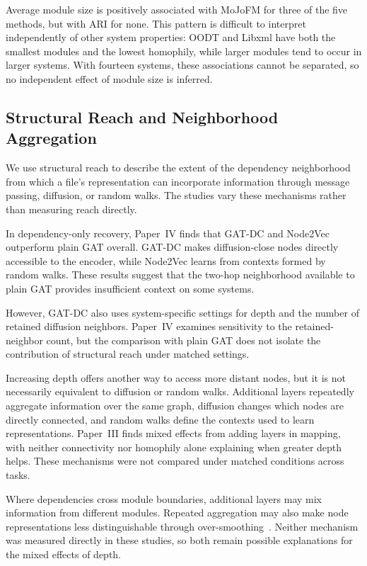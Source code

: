 Average module size is positively associated with MoJoFM for three of the five methods, but with ARI for none. This pattern is difficult to interpret independently of other system properties: OODT and Libxml have both the smallest modules and the lowest homophily, while larger modules tend to occur in larger systems. With fourteen systems, these associations cannot be separated, so no independent effect of module size is inferred.

\subsection{Structural Reach and Neighborhood Aggregation\label{sec:structural-reach}}
We use structural reach to describe the extent of the dependency neighborhood from which a file's representation can incorporate information through message passing, diffusion, or random walks. The studies vary these mechanisms rather than measuring reach directly.

In dependency-only recovery, Paper~IV finds that GAT-DC and Node2Vec outperform plain GAT overall. GAT-DC makes diffusion-close nodes directly accessible to the encoder, while Node2Vec learns from contexts formed by random walks. These results suggest that the two-hop neighborhood available to plain GAT provides insufficient context on some systems.

However, GAT-DC also uses system-specific settings for depth and the number of retained diffusion neighbors. Paper~IV examines sensitivity to the retained-neighbor count, but the comparison with plain GAT does not isolate the contribution of structural reach under matched settings.

Increasing depth offers another way to access more distant nodes, but it is not necessarily equivalent to diffusion or random walks. Additional layers repeatedly aggregate information over the same graph, diffusion changes which nodes are directly connected, and random walks define the contexts used to learn representations. Paper~III finds mixed effects from adding layers in mapping, with neither connectivity nor homophily alone explaining when greater depth helps. These mechanisms were not compared under matched conditions across tasks.

Where dependencies cross module boundaries, additional layers may mix information from different modules. Repeated aggregation may also make node representations less distinguishable through over-smoothing~\cite{gnn_oversmoothing}. Neither mechanism was measured directly in these studies, so both remain possible explanations for the mixed effects of depth.

